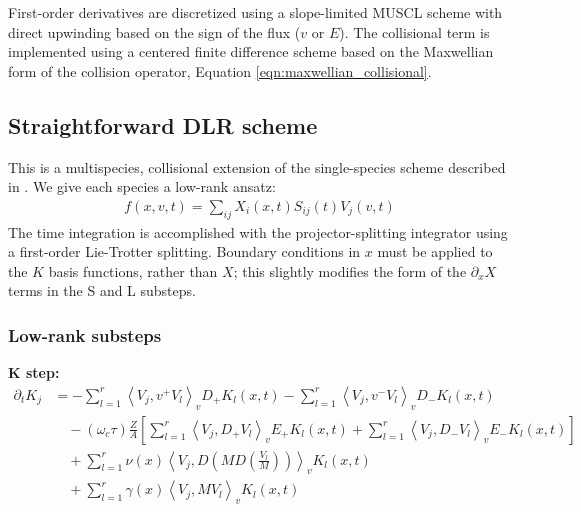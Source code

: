 \documentclass{article}
\begin{document}
First-order derivatives are discretized using a slope-limited MUSCL scheme with direct upwinding based on the
sign of the flux ($v$ or $E$).
The collisional term is implemented using a centered finite difference scheme based on the Maxwellian
form of the collision operator, Equation \eqref{eqn:maxwellian_collisional}.

\subsection{Straightforward DLR scheme}

This is a multispecies, collisional extension of the single-species scheme described in
\cite{einkemmerLowRankProjectorSplittingIntegrator2018}.
We give each species a low-rank ansatz:
\begin{align*}
    f(x, v, t) = \sum_{ij} X_i(x, t) S_{ij}(t) V_j(v, t)
\end{align*}
The time integration is accomplished with the projector-splitting integrator using a first-order
Lie-Trotter splitting.
Boundary conditions in $x$ must be applied to the $K$ basis functions, rather than $X$; this slightly modifies
the form of the $\partial_x X$ terms in the S and L substeps.

\subsubsection{Low-rank substeps}

\textbf{K step:}
\begin{align*}
    \partial_t K_j &= -\sum_{l=1}^r \left\langle V_j, v^+ V_l \right\rangle_v D_+ K_l(x, t) - \sum_{l=1}^r \left\langle V_j, v^- V_l \right\rangle_v D_- K_l(x, t)  \\
                         &\quad - (\omega_c \tau) \frac{Z}{A} \left[ \sum_{l=1}^r \left\langle V_j, D_+ V_l \right\rangle_v E_+ K_l(x, t) + \sum_{l=1}^r \left\langle V_j, D_- V_l \right\rangle_v E_- K_l(x, t) \right] \\
                         &\quad + \sum_{l=1}^r \nu(x) \left\langle V_j, D \left( M D \left( \frac{V_l}{M} \right) \right) \right\rangle_v K_l(x, t) \\
                         &\quad + \sum_{l=1}^r \gamma(x) \left\langle V_j, M V_l \right\rangle_v K_l(x, t)
\end{align*}
\end{document}
